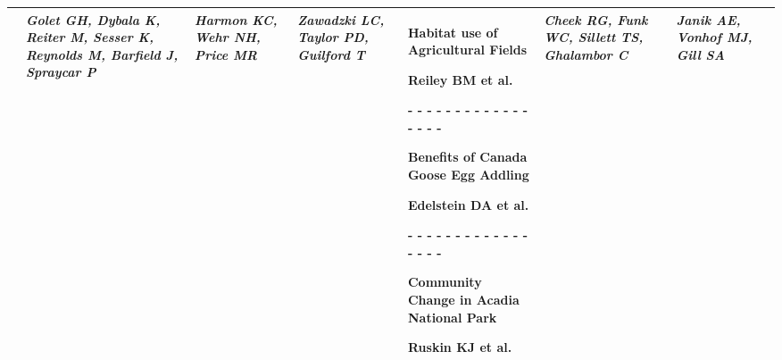 \begin{tabular}{|x{0.8cm}|x{2.65cm}|x{2.65cm}|x{2.65cm}|x{2.65cm}|x{2.65cm}|x{2.65cm}|@{}m{0pt}@{}}
\hline
{}& \par \vspace{8pt} \textit{Golet GH, Dybala K, Reiter M, Sesser K, Reynolds M, Barfield J, Spraycar P} &  \par \vspace{8pt} \textit{Harmon KC, Wehr NH, Price MR} &  \par \vspace{8pt} \textit{Zawadzki LC, Taylor PD, Guilford T} & \scriptsize Habitat use of Agricultural Fields\par \tiny Reiley BM et al. \par - - - - - - - - - - - - - - - - - \par \vspace{2pt} \scriptsize Benefits of Canada Goose Egg Addling\par \tiny Edelstein DA et al. \par - - - - - - - - - - - - - - - - - \par \vspace{2pt} \scriptsize Community Change in Acadia National Park\par \tiny Ruskin KJ et al.  &  \par \vspace{8pt} \textit{Cheek RG, Funk WC, Sillett TS, Ghalambor C} &  \par \vspace{8pt} \textit{Janik AE, Vonhof MJ, Gill SA}&\\[25ex]
\hline

\end{tabular}
